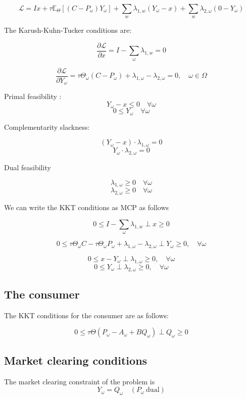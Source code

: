 \documentclass[12pt, letterpaper]{article}
\begin{document}
\[ \mathcal{L}= Ix + \tau \mathbb{E}_\Theta [(C-P_\omega) Y_\omega ] + \sum_w \lambda_{1,w} (Y_\omega -x) + \sum_w \lambda_{2,\omega}(0-Y_\omega) \]

The Karush-Kuhn-Tucker conditions  are:

\[ \frac{\partial \mathcal{L}}{\partial x}= I- \sum_{\omega}\lambda_{1,w} = 0  \]

\[\frac{\partial \mathcal{L}}{\partial Y_{\omega}} = \tau \Theta_\omega ( C - P_\omega ) + \lambda_{1, \omega} - \lambda_{2,\omega} =  0,\quad\omega\in\Omega \]

\vspace{1cm}

Primal feasibility :
\[ Y_\omega - x \leq 0 \quad  \forall \omega  \]
\[ 0 \leq Y_\omega \quad \forall \omega \]

Complementarity slackness: 

\[ (Y_\omega - x) \cdot \lambda_{1,\omega} = 0 \]
\[ Y_\omega \cdot \lambda_{2,\omega} = 0\]

Dual feasibility

\[ \lambda_{1,\omega} \geq 0 \quad \forall \omega \]
\[ \lambda_{2,\omega} \geq 0 \quad \forall \omega \]

We can write the KKT conditions as MCP as follows

\[ 0 \leq I- \sum_{\omega}\lambda_{1,w} \perp x \geq 0 \] 

\[ 0 \leq \tau \Theta_\omega C - \tau \Theta_\omega P_\omega + \lambda_{1,\omega} - \lambda_{2,\omega} \perp Y_\omega \geq 0, \quad \forall \omega\]

\[ 0 \leq x - Y_\omega \perp \lambda_{1,\omega} \geq 0 , \quad \forall \omega \]
\[ 0 \leq Y_\omega \perp \lambda_{2,\omega} \geq 0, \quad \forall \omega \]

\subsection{The consumer}

The KKT conditions for the consumer are as follows:

\[ 0 \leq \tau \Theta (P_\omega - A_\omega + B Q_\omega) \perp Q_\omega \geq 0\]




\subsection{Market clearing conditions}
 
 The market clearing constraint of the problem is 
\[ Y_\omega = Q_\omega \quad (P_\omega \  \textrm{dual})\]
\end{document}
